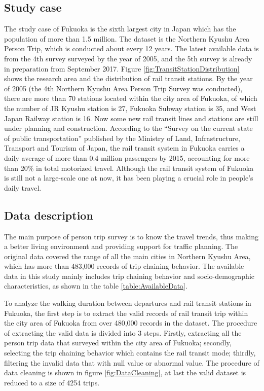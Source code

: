 \documentclass[Journal,letterpaper]{ascelike-new}
\begin{document}
\subsection{Study case}
The study case of Fukuoka is the sixth largest city in Japan which has the population of more than 1.5 million. The dataset is the Northern Kyushu Area Person Trip, which is conducted about every 12 years. The latest available data is from the 4th survey surveyed by the year of 2005, and the 5th survey is already in preparation from September 2017. Figure \ref{fig:TransitStationDistribution} shows the research area and the distribution of rail transit stations. By the year of 2005 (the 4th Northern Kyushu Area Person Trip Survey was conducted), there are more than 70 stations located within the city area of Fukuoka, of which the number of JR Kyushu station is 27, Fukuoka Subway station is 35, and West Japan Railway station is 16. Now some new rail transit lines and stations are still under planning and construction. According to the “Survey on the current state of public transportation” published by the Ministry of Land, Infrastructure, Transport and Tourism of Japan, the rail transit system in Fukuoka carries a daily average of more than 0.4 million passengers by 2015, accounting for more than 20\% in total motorized travel. Although the rail transit system of Fukuoka is still not a large-scale one at now, it has been playing a crucial role in people's daily travel.

%
\subsection{Data description}
%
The main purpose of person trip survey is to know the travel trends, thus making a better living environment and providing support for traffic planning. The original data covered the range of all the main cities in Northern Kyushu Area, which has more than 483,000 records of trip chaining behavior. The available data in this study mainly includes trip chaining behavior and socio-demographic characteristics, as shown in the table \ref{table:AvailableData}.

%
To analyze the walking duration between departures and rail transit stations in Fukuoka, the first step is to extract the valid records of rail transit trip within the city area of Fukuoka from over 480,000 records in the dataset. The procedure of extracting the valid data is divided into 3 steps. Firstly, extracting all the person trip data that surveyed within the city area of Fukuoka; secondly, selecting the trip chaining behavior which contains the rail transit mode; thirdly, filtering the invalid data that with null value or abnormal value. The procedure of data cleaning is shown in figure \ref{fig:DataCleaning}, at last the valid dataset is reduced to a size of 4254 trips.
\end{document}
